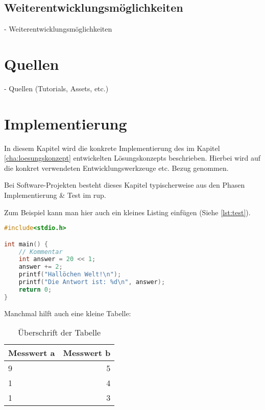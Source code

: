 \documentclass[oneside]{ausarbeitung}
\begin{document}
\section{Weiterentwicklungsmöglichkeiten}

  - Weiterentwicklungsmöglichkeiten


\chapter{Quellen}

- Quellen (Tutorials, Assets, etc.)












\chapter{Implementierung}
\label{cha:implementierung}

In diesem Kapitel wird die konkrete Implementierung des im Kapitel
\ref{cha:loesungskonzept} entwickelten Lösungskonzepts beschrieben.
Hierbei wird auf die konkret verwendeten Entwicklungswerkzeuge etc. 
Bezug genommen.

Bei Software-Projekten besteht dieses Kapitel typischerweise aus den 
Phasen Implementierung \& Test im \ac{rup}.

Zum Beispiel kann man hier auch ein kleines Listing einfügen (Siehe \ref{lst:test}).

\begin{lstlisting}[language=c,%
                   caption={Überschrift des Quelltexts},label=lst:test]
#include<stdio.h>

int main() {
    // Kommentar
    int answer = 20 << 1;
    answer += 2;
    printf("Hallöchen Welt!\n");
    printf("Die Antwort ist: %d\n", answer);
    return 0;
}
\end{lstlisting}

Manchmal hilft auch eine kleine Tabelle:

\begin{table}[htbp]
\centering
\begin{tabular}{|l|r|}
\hline
\textbf{Messwert a} & \textbf{Messwert b} \\ \hline
9 & 5 \\ \hline
1 & 4 \\ \hline
1 & 3 \\ \hline
\end{tabular}
\caption{Überschrift der Tabelle}
\label{tab:my-table}
\end{table}
\end{document}
